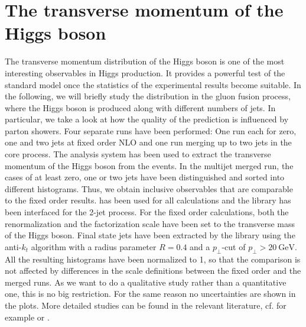 \section{The transverse momentum of the Higgs boson}
\label{sec:higgs_pt}
The transverse momentum distribution of the Higgs boson is one of the most interesting observables in Higgs production.
It provides a powerful test of the standard model once the statistics of the experimental results become suitable.
In the following, we will briefly study the distribution in the gluon fusion process, where the Higgs boson is produced along with different numbers of jets.
In particular, we take a look at how the quality of the prediction is influenced by parton showers.
Four separate runs have been performed: One run each for zero, one and two jets at fixed order NLO and one \mcatnlo{} run merging up to two jets in the core process.
The \rivet{} analysis system has been used to extract the transverse momentum of the Higgs boson from the events.
In the multijet merged run, the cases of at least zero, one or two jets have been distinguished and sorted into different histograms.
Thus, we obtain inclusive observables that are comparable to the fixed order results.
\sherpa{} has been used for all calculations and the \mcfm{} library \cite{mcfm_hjj} has been interfaced for the 2-jet process.
For the fixed order calculations, both the renormalization and the factorization scale have been set to the transverse mass of the Higgs boson.
Final state jets have been extracted by the \fastjet{} library \cite{fastjet_manual} using the anti-$k_t$ algorithm \cite{anti_kt} with a radius parameter $R=0.4$ and a $p_\perp$-cut of $p_\perp > \SI{20}{\giga\electronvolt}$.
All the resulting histograms have been normalized to \num{1}, so that the comparison is not affected by differences in the scale definitions between the fixed order and the merged runs.
As we want to do a qualitative study rather than a quantitative one, this is no big restriction.
For the same reason no uncertainties are shown in the plots.
More detailed studies can be found in the relevant literature, cf. for example \cite{symmetrybreaking1,symmetrybreaking2} or \cite{higgshandbook1,higgshandbook2,higgshandbook3}.

